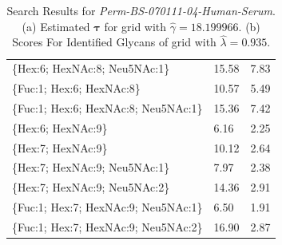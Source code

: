 \begin{table}
\begin{minipage}[t]{0.55\linewidth}
\begin{small}
\begin{tabular}{l|p{2cm} p{2cm}}
\{Hex:6; HexNAc:8; Neu5NAc:1\}        &                15.58 &               7.83 \\
\{Fuc:1; Hex:6; HexNAc:8\}            &                10.57 &               5.49 \\
\{Fuc:1; Hex:6; HexNAc:8; Neu5NAc:1\} &                15.36 &               7.42 \\
\{Hex:6; HexNAc:9\}                   &                 6.16 &               2.25 \\
\{Hex:7; HexNAc:9\}                   &                10.12 &               2.64 \\
\{Hex:7; HexNAc:9; Neu5NAc:1\}        &                 7.97 &               2.38 \\
\{Hex:7; HexNAc:9; Neu5NAc:2\}        &                14.36 &               2.91 \\
\{Fuc:1; Hex:7; HexNAc:9; Neu5NAc:1\} &                 6.50 &               1.91 \\
\{Fuc:1; Hex:7; HexNAc:9; Neu5NAc:2\} &                16.90 &               2.87 \\
\end{tabular}

    \end{small}
    
        \end{minipage}
        \caption{
                 Search Results for \textit{Perm-BS-070111-04-Human-Serum}.
                 (a) Estimated $\mathbf{\tau}$ for grid with ${\hat \gamma} = 18.199966$.
                 (b) Scores For Identified Glycans of grid with ${\hat \lambda} = 0.935$.}
        \label{tbl:rp_human_serum_score_table}
    \end{table}
